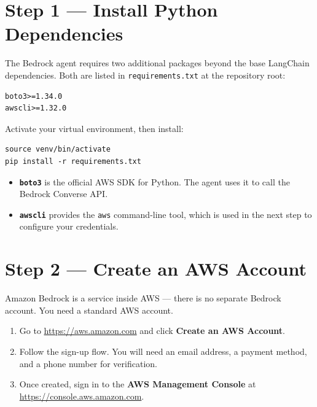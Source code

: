 \documentclass[12pt, a4paper]{article}
\begin{document}
\section{Step 1 — Install Python Dependencies}

The Bedrock agent requires two additional packages beyond the base LangChain dependencies. Both are listed in \texttt{requirements.txt} at the repository root:

\begin{lstlisting}[language={}]
boto3>=1.34.0
awscli>=1.32.0
\end{lstlisting}

Activate your virtual environment, then install:

\begin{lstlisting}[style=shellstyle]
source venv/bin/activate
pip install -r requirements.txt
\end{lstlisting}

\begin{itemize}[leftmargin=1.5em]
  \item \textbf{\texttt{boto3}} is the official AWS SDK for Python. The agent uses it to call the Bedrock Converse API.
  \item \textbf{\texttt{awscli}} provides the \texttt{aws} command-line tool, which is used in the next step to configure your credentials.
\end{itemize}

\section{Step 2 — Create an AWS Account}

Amazon Bedrock is a service inside AWS — there is no separate Bedrock account. You need a standard AWS account.

\begin{enumerate}[leftmargin=1.5em]
  \item Go to \url{https://aws.amazon.com} and click \textbf{Create an AWS Account}.
  \item Follow the sign-up flow. You will need an email address, a payment method, and a phone number for verification.
  \item Once created, sign in to the \textbf{AWS Management Console} at \url{https://console.aws.amazon.com}.
\end{enumerate}
\end{document}
